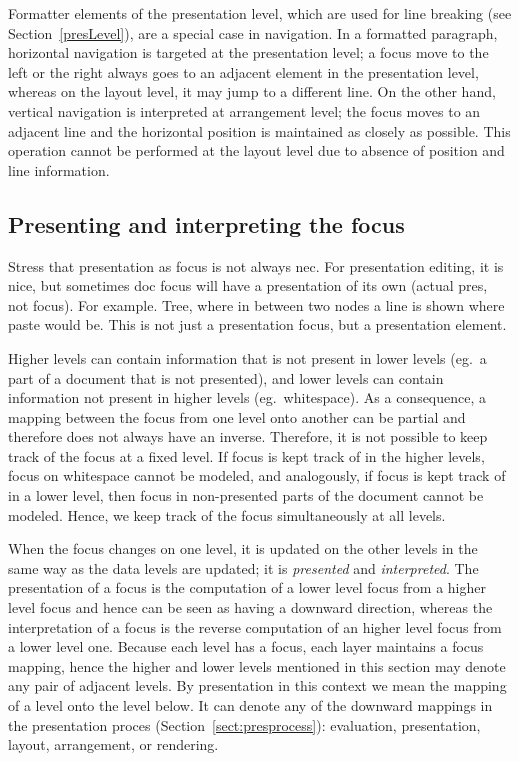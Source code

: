 
Formatter elements of the presentation level, which are used for line breaking (see Section~\ref{presLevel}), are a special case in navigation. In a formatted paragraph, horizontal navigation is targeted at the presentation level; a focus move to the left or the right always goes to an adjacent element in the presentation level, whereas on the layout level, it may jump to a different line. On the other hand, vertical navigation is interpreted at arrangement level; the focus moves to an adjacent line and the horizontal position is maintained as closely as possible. This operation cannot be performed at the layout level due to absence of position and line information. 
 
 
%																
\subsection{Presenting and interpreting the focus}

\bc
Stress that presentation as focus is not always nec. For presentation editing, it is nice, but sometimes doc
focus will have a presentation of its own (actual pres, not focus). For example. Tree, where in between two nodes a line is shown where paste would be. This is not just a presentation focus, but a presentation element.
\ec 

Higher levels can contain information that is not present in lower levels (eg.\ a part of a document that is not presented), and lower levels can contain information not present in higher levels (eg.\ whitespace). As a consequence, a mapping between the focus from one level onto another can be partial and therefore does not always have an inverse. Therefore, it is not possible to keep track of the focus at a fixed level. If focus is kept track of in the higher levels, focus on whitespace cannot be modeled, and analogously, if focus is kept track of in a lower level, then focus in non-presented parts of the document cannot be modeled. Hence, we keep track of the focus simultaneously at all levels. 

When the focus changes on one level, it is updated on the other levels in the same way as the data levels are updated; it is {\em presented} and {\em interpreted}. The presentation of a focus is the computation of a lower level focus from a higher level focus and hence can be seen as having a downward direction, whereas the interpretation of a focus is the reverse computation of an higher level focus from a lower level one. Because each level has a focus, each layer maintains a focus mapping, hence the higher and lower levels mentioned in this section may denote any pair of adjacent levels. By presentation in this context we mean the mapping of a level onto the level below. It can denote any of the downward mappings in the presentation proces (Section~\ref{sect:presprocess}): evaluation, presentation, layout, arrangement, or rendering.

